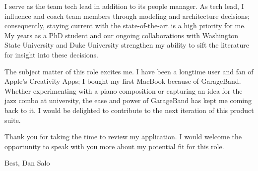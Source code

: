 \documentclass[resmargin, 11pt]{resume_style_class} %
\begin{document}
I serve as the team tech lead in addition to its people manager. As tech lead, I influence and coach team members through modeling and architecture decisions; consequently, staying current with the state-of-the-art is a high priority for me. My years as a PhD student and our ongoing collaborations with Washington State University and Duke University strengthen my ability to sift the literature for insight into these decisions. 

The subject matter of this role excites me. I have been a longtime user and fan of Apple’s Creativity Apps; I bought my first MacBook because of GarageBand. Whether experimenting with a piano composition or capturing an idea for the jazz combo at university, the ease and power of GarageBand has kept me coming back to it. I would be delighted to contribute to the next iteration of this product suite.

Thank you for taking the time to review my application. I would welcome the opportunity to speak with you more about my potential fit for this role. 

Best,
\newline
Dan Salo

		
		
		




	
\end{document}
